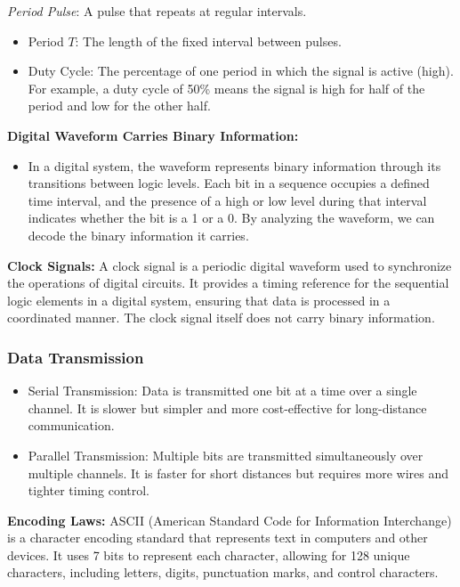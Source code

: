 \documentclass[11pt,a4paper]{article}
\providecommand{\tightlist}{\setlength{\itemsep}{1pt}\setlength{\parskip}{0pt}}
\begin{document}
\emph{Period Pulse}: A pulse that repeats at regular intervals.

\begin{itemize}
\tightlist
\item
  Period \(T\): The length of the fixed interval between pulses.
\item
  Duty Cycle: The percentage of one period in which the signal is active
  (high). For example, a duty cycle of 50\% means the signal is high for
  half of the period and low for the other half.
\end{itemize}

\textbf{Digital Waveform Carries Binary Information:}

\begin{itemize}
\tightlist
\item
  In a digital system, the waveform represents binary information
  through its transitions between logic levels. Each bit in a sequence
  occupies a defined time interval, and the presence of a high or low
  level during that interval indicates whether the bit is a 1 or a 0. By
  analyzing the waveform, we can decode the binary information it
  carries.
\end{itemize}

\textbf{Clock Signals:} A clock signal is a periodic digital waveform
used to synchronize the operations of digital circuits. It provides a
timing reference for the sequential logic elements in a digital system,
ensuring that data is processed in a coordinated manner. The clock
signal itself does not carry binary information.

\subsubsection{Data Transmission}\label{data-transmission}

\begin{itemize}
\tightlist
\item
  Serial Transmission: Data is transmitted one bit at a time over a
  single channel. It is slower but simpler and more cost-effective for
  long-distance communication.
\item
  Parallel Transmission: Multiple bits are transmitted simultaneously
  over multiple channels. It is faster for short distances but requires
  more wires and tighter timing control.
\end{itemize}

\textbf{Encoding Laws:} ASCII (American Standard Code for Information
Interchange) is a character encoding standard that represents text in
computers and other devices. It uses 7 bits to represent each character,
allowing for 128 unique characters, including letters, digits,
punctuation marks, and control characters.
\end{document}
